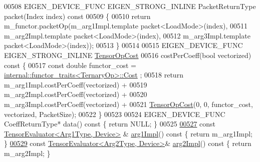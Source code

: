 \begin{DoxyCode}
00508   EIGEN\_DEVICE\_FUNC EIGEN\_STRONG\_INLINE PacketReturnType packet(Index index)\textcolor{keyword}{ const}
00509 \textcolor{keyword}{  }\{
00510     \textcolor{keywordflow}{return} m\_functor.packetOp(m\_arg1Impl.template packet<LoadMode>(index),
00511                               m\_arg2Impl.template packet<LoadMode>(index),
00512                               m\_arg3Impl.template packet<LoadMode>(index));
00513   \}
00514 
00515   EIGEN\_DEVICE\_FUNC EIGEN\_STRONG\_INLINE \hyperlink{class_eigen_1_1_tensor_op_cost}{TensorOpCost}
00516   costPerCoeff(\textcolor{keywordtype}{bool} vectorized)\textcolor{keyword}{ const }\{
00517     \textcolor{keyword}{const} \textcolor{keywordtype}{double} functor\_cost = \hyperlink{struct_eigen_1_1internal_1_1functor__traits}{internal::functor\_traits<TernaryOp>::Cost}
      ;
00518     \textcolor{keywordflow}{return} m\_arg1Impl.costPerCoeff(vectorized) +
00519            m\_arg2Impl.costPerCoeff(vectorized) +
00520            m\_arg3Impl.costPerCoeff(vectorized) +
00521            \hyperlink{class_eigen_1_1_tensor_op_cost}{TensorOpCost}(0, 0, functor\_cost, vectorized, PacketSize);
00522   \}
00523 
00524   EIGEN\_DEVICE\_FUNC CoeffReturnType* data()\textcolor{keyword}{ const }\{ \textcolor{keywordflow}{return} NULL; \}
00525 
\hyperlink{struct_eigen_1_1_tensor_evaluator_3_01const_01_tensor_cwise_ternary_op_3_01_ternary_op_00_01_arg9fef65261bbea39b0e5e8b56a6f07cfb_a6e9e8b5cc53638c9a0c1267a5a1d0217}{00527}   \textcolor{keyword}{const} \hyperlink{struct_eigen_1_1_tensor_evaluator}{TensorEvaluator<Arg1Type, Device>} & 
      \hyperlink{struct_eigen_1_1_tensor_evaluator_3_01const_01_tensor_cwise_ternary_op_3_01_ternary_op_00_01_arg9fef65261bbea39b0e5e8b56a6f07cfb_a6e9e8b5cc53638c9a0c1267a5a1d0217}{arg1Impl}()\textcolor{keyword}{ const }\{ \textcolor{keywordflow}{return} m\_arg1Impl; \}
\hyperlink{struct_eigen_1_1_tensor_evaluator_3_01const_01_tensor_cwise_ternary_op_3_01_ternary_op_00_01_arg9fef65261bbea39b0e5e8b56a6f07cfb_a73aee3fd35d2e94dd45ccc2d17dfe976}{00529}   \textcolor{keyword}{const} \hyperlink{struct_eigen_1_1_tensor_evaluator}{TensorEvaluator<Arg2Type, Device>}& 
      \hyperlink{struct_eigen_1_1_tensor_evaluator_3_01const_01_tensor_cwise_ternary_op_3_01_ternary_op_00_01_arg9fef65261bbea39b0e5e8b56a6f07cfb_a73aee3fd35d2e94dd45ccc2d17dfe976}{arg2Impl}()\textcolor{keyword}{ const }\{ \textcolor{keywordflow}{return} m\_arg2Impl; \}

\end{DoxyCode}
